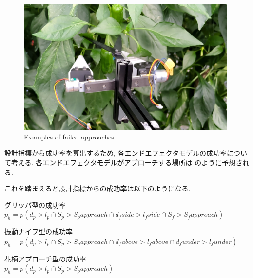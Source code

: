 \begin{figure}[H]
    \centering
    \includegraphics[width=110mm]{images/png/failure.png}
    \caption{Examples of failed approaches}
    \label{Fig:failure}
  \end{figure}

設計指標から成功率を算出するため, 各エンドエフェクタモデルの成功率について考える.
各エンドエフェクタモデルがアプローチする場所は のように予想される.

\begin{table}[htbp]
  \begin{center}
    \caption{Approach area of each model}
    \label{Tab:approach}
  \end{center}
\end{table}

これを踏まえると設計指標からの成功率は以下のようになる.

グリッパ型の成功率\\
\vspace{5mm}
$p_h = p(d_p > l_p \cap S_p > S_papproach \cap d_fside > l_fside \cap S_f > S_fapproach)$

振動ナイフ型の成功率\\
\vspace{5mm}
$p_h = p(d_p > l_p \cap S_p > S_papproach \cap d_fabove > l_fabove \cap d_funder > l_funder)$

花柄アプローチ型の成功率\\
\vspace{5mm}
$p_h = p(d_p > l_p \cap S_p > S_papproach)$